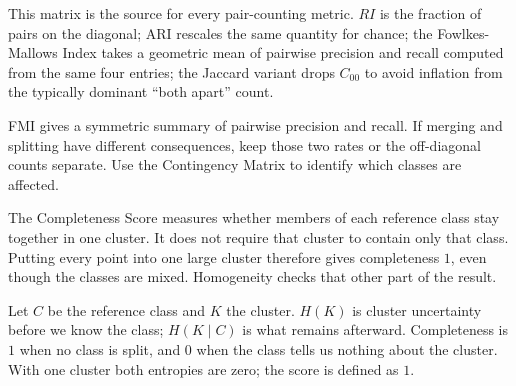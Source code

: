 {This matrix is the source for every pair-counting metric. $RI$ is the fraction of pairs on the diagonal; ARI rescales the same quantity for chance; the Fowlkes-Mallows Index takes a geometric mean of pairwise precision and recall computed from the same four entries; the Jaccard variant drops $C_{00}$ to avoid inflation from the typically dominant ``both apart'' count.}

\metricsecondary

FMI gives a symmetric summary of pairwise precision and recall. If merging and splitting have different consequences, keep those two rates or the off-diagonal counts separate. Use the Contingency Matrix to identify which classes are affected.

\metricend
\clearpage
\thispagestyle{clusteringstyle}
\label{sec:completeness-score}

The Completeness Score measures whether members of each reference class stay together in one cluster. It does not require that cluster to contain only that class. Putting every point into one large cluster therefore gives completeness $1$, even though the classes are mixed. Homogeneity checks that other part of the result.

\begin{metricformula}
\end{metricformula}

Let $C$ be the reference class and $K$ the cluster. $H(K)$ is cluster uncertainty before we know the class; $H(K\mid C)$ is what remains afterward. Completeness is $1$ when no class is split, and $0$ when the class tells us nothing about the cluster. With one cluster both entropies are zero; the score is defined as $1$.


